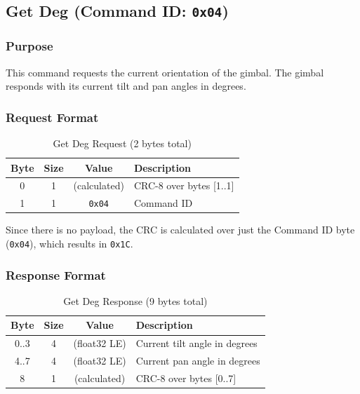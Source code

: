 \documentclass[12pt, titlepage]{article}
\begin{document}
\subsection{Get Deg (Command ID: \texttt{0x04})}

\subsubsection{Purpose}
This command requests the current orientation of the gimbal. The gimbal
responds with its current tilt and pan angles in degrees.

\subsubsection{Request Format}

\begin{table}[H]
  \centering
  \begin{tabular}{cccl}
    \toprule
    \textbf{Byte} & \textbf{Size} & \textbf{Value} & \textbf{Description}    \\
    \midrule
    0             & 1             & (calculated)   & CRC-8 over bytes [1..1] \\
    1             & 1             & \texttt{0x04}  & Command ID              \\
    \bottomrule
  \end{tabular}
  \caption{Get Deg Request (2 bytes total)}
\end{table}

Since there is no payload, the CRC is calculated over just the Command ID byte
(\texttt{0x04}), which results in \texttt{0x1C}.

\subsubsection{Response Format}

\begin{table}[H]
  \centering
  \begin{tabular}{cccl}
    \toprule
    \textbf{Byte} & \textbf{Size} & \textbf{Value} & \textbf{Description}          \\
    \midrule
    0..3          & 4             & (float32 LE)   & Current tilt angle in degrees \\
    4..7          & 4             & (float32 LE)   & Current pan angle in degrees  \\
    8             & 1             & (calculated)   & CRC-8 over bytes [0..7]       \\
    \bottomrule
  \end{tabular}
  \caption{Get Deg Response (9 bytes total)}
\end{table}
\end{document}
